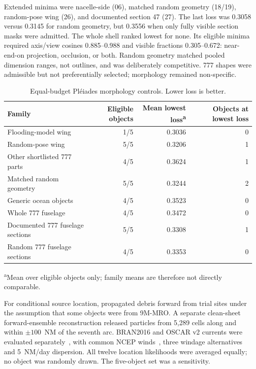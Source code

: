 Extended minima were nacelle-side (06), matched random geometry (18/19),
random-pose wing (26), and documented section 47 (27). The last loss was
0.3058 versus 0.3145 for random geometry, but 0.3556 when only fully visible
section masks were admitted. The whole shell ranked lowest for none. Its
eligible minima required axis/view cosines 0.885--0.988 and visible fractions
0.305--0.672: near-end-on projection, occlusion, or both. Random geometry
matched pooled dimension ranges, not outlines, and was deliberately
competitive. 777 shapes were admissible but not preferentially selected;
morphology remained non-specific.

\begin{table}[t]
  \centering
  \footnotesize
  \caption{Equal-budget Pl\'eiades morphology controls. Lower loss is better.}
  \label{tab:pleiades-morphology-controls}
  \begin{tabular}{lrrr}
    \toprule
    Family & Eligible objects & Mean lowest loss\textsuperscript{a} &
      Objects at lowest loss \\
    \midrule
    Flooding-model wing            & 1/5 & 0.3036 & 0 \\
    Random-pose wing               & 5/5 & 0.3206 & 1 \\
    Other shortlisted 777 parts    & 4/5 & 0.3624 & 1 \\
    Matched random geometry        & 5/5 & 0.3244 & 2 \\
    Generic ocean objects          & 4/5 & 0.3523 & 0 \\
    Whole 777 fuselage               & 4/5 & 0.3472 & 0 \\
    Documented 777 fuselage sections & 5/5 & 0.3308 & 1 \\
    Random 777 fuselage sections     & 4/5 & 0.3353 & 0 \\
    \bottomrule
  \end{tabular}

  \vspace{2pt}
  \parbox{0.94\linewidth}{\footnotesize\textsuperscript{a}Mean over eligible
  objects only; family means are therefore not directly comparable.}
\end{table}

For conditional source location, \citet{griffin2017drift} propagated debris
forward from trial sites under the assumption that some objects
were from 9M-MRO. A separate clean-sheet forward-ensemble reconstruction
released particles from 5,289 cells along and within $\pm100$~NM of the
seventh arc. BRAN2016 and OSCAR v2 currents were evaluated
separately~\citep{dohan2021oscar}, with common NCEP
winds~\citep{kalnay1996reanalysis}, three windage alternatives and
5~NM/day dispersion. All twelve location likelihoods were averaged equally;
no object was randomly drawn. The five-object set was a sensitivity.

